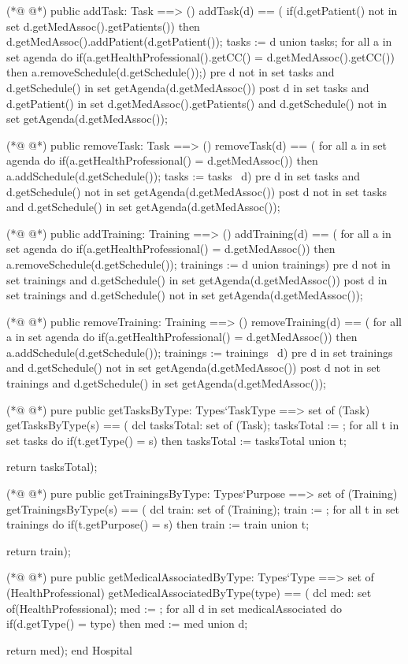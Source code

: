 \begin{vdmpp}[breaklines=true]
(*@
\label{addTask:68}
@*)
 public addTask: Task ==> ()
  addTask(d) == (
   if(d.getPatient() not in set d.getMedAssoc().getPatients())
    then d.getMedAssoc().addPatient(d.getPatient());
   tasks := {d} union tasks;
   for all a in set agenda do
    if(a.getHealthProfessional().getCC() = d.getMedAssoc().getCC())
      then a.removeSchedule(d.getSchedule());)
 pre d not in set tasks and d.getSchedule() in set getAgenda(d.getMedAssoc())
 post d in set tasks and d.getPatient() in set d.getMedAssoc().getPatients() and d.getSchedule() not in set getAgenda(d.getMedAssoc());
  
(*@
\label{removeTask:79}
@*)
 public removeTask: Task ==> ()
  removeTask(d) == (
   for all a in set agenda do
    if(a.getHealthProfessional() = d.getMedAssoc())
      then a.addSchedule(d.getSchedule());
   tasks := tasks \ {d})
 pre d in set tasks and d.getSchedule() not in set getAgenda(d.getMedAssoc())
 post d not in set tasks and d.getSchedule() in set getAgenda(d.getMedAssoc());
 
(*@
\label{addTraining:88}
@*)
 public addTraining: Training ==> ()
  addTraining(d) == (
   for all a in set agenda do
    if(a.getHealthProfessional() = d.getMedAssoc())
      then a.removeSchedule(d.getSchedule());
   trainings := {d} union trainings)
 pre d not in set trainings and d.getSchedule() in set getAgenda(d.getMedAssoc())
 post d in set trainings and d.getSchedule() not in set getAgenda(d.getMedAssoc());
  
(*@
\label{removeTraining:97}
@*)
 public removeTraining: Training ==> ()
  removeTraining(d) == (
   for all a in set agenda do
    if(a.getHealthProfessional() = d.getMedAssoc())
      then a.addSchedule(d.getSchedule());
   trainings := trainings \ {d})
 pre d in set trainings and d.getSchedule() not in set getAgenda(d.getMedAssoc())
 post d not in set trainings and d.getSchedule() in set getAgenda(d.getMedAssoc());
 
(*@
\label{getTasksByType:106}
@*)
 pure public getTasksByType: Types`TaskType ==> set of (Task)
  getTasksByType(s) == (
   dcl tasksTotal: set of (Task);
   tasksTotal := {};
   for all t in set tasks do
    if(t.getType() = s)
     then tasksTotal := tasksTotal union {t};
     
   return tasksTotal);
              
(*@
\label{getTrainingsByType:116}
@*)
 pure public getTrainingsByType: Types`Purpose ==> set of (Training)
  getTrainingsByType(s) == (
   dcl train: set of (Training);
   train := {};
   for all t in set trainings do
    if(t.getPurpose() = s)
     then train := train union {t};
     
   return train);

(*@
\label{getMedicalAssociatedByType:126}
@*)
 pure public getMedicalAssociatedByType: Types`Type ==> set of (HealthProfessional)
  getMedicalAssociatedByType(type) == (
   dcl med: set of(HealthProfessional);
   med := {};
   for all d in set medicalAssociated do
    if(d.getType() = type)
     then med := med union {d};
    
   return med);
end Hospital
\end{vdmpp}

